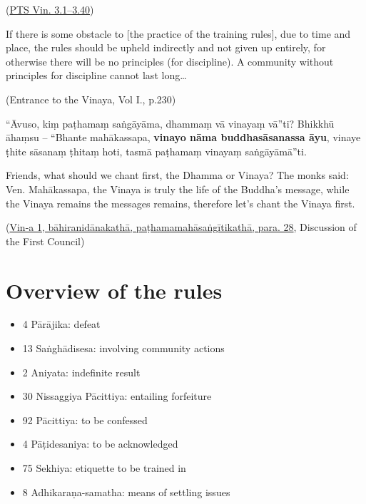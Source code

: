 (\href{https://suttacentral.net/pli-tv-bu-vb-pj1/en/brahmali}{PTS Vin.
3.1--3.40})

If there is some obstacle to {[}the practice of the training rules{]},
due to time and place, the rules should be upheld indirectly and not
given up entirely, for otherwise there will be no principles (for
discipline). A community without principles for discipline cannot last
long\ldots{}

(Entrance to the Vinaya, Vol I., p.230)

\clearpage

``Āvuso, kiṃ paṭhamaṃ saṅgāyāma, dhammaṃ vā vinayaṃ vā''ti? Bhikkhū
āhaṃsu -- ``Bhante mahākassapa, \textbf{vinayo nāma buddhasāsanassa
āyu}, vinaye ṭhite sāsanaṃ ṭhitaṃ hoti, tasmā paṭhamaṃ vinayaṃ
saṅgāyāmā''ti.

Friends, what should we chant first, the Dhamma or Vinaya? The monks
said: Ven. Mahākassapa, the Vinaya is truly the life of the Buddha's
message, while the Vinaya remains the messages remains, therefore let's
chant the Vinaya first.

(\href{https://www.digitalpalireader.online/_dprhtml/index.html?loc=v.0.1.0.0.1.0.a\&query=vinayo\%20n\%C4\%81ma\%20buddhas\%C4\%81sanassa\%20\%C4\%81yu\&para=28}{Vin-a
1, bāhiranidānakathā, paṭhamamahāsaṅgītikathā, para. 28}, Discussion of
the First Council)

\section{Overview of the rules}

\begin{multicols}{2}

\begin{itemize}
\tightlist
\item
  4 Pārājika: defeat
\item
  13 Saṅghādisesa: involving community actions
\item
  2 Aniyata: indefinite result
\item
  30 Nissaggiya Pācittiya: entailing forfeiture
\end{itemize}

\columnbreak

\begin{itemize}
\tightlist
\item
  92 Pācittiya: to be confessed
\item
  4 Pāṭidesaniya: to be acknowledged
\item
  75 Sekhiya: etiquette to be trained in
\item
  8 Adhikaraṇa-samatha: means of settling issues
\end{itemize}

\end{multicols}

